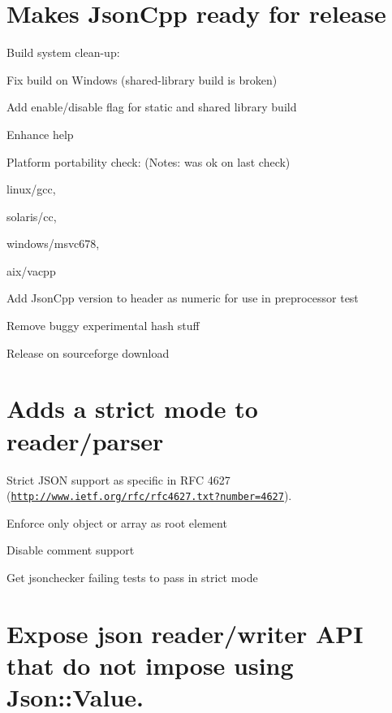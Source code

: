 \hypertarget{roadmap_ms_release}{}\section{Makes Json\+Cpp ready for release}\label{roadmap_ms_release}

\begin{DoxyItemize}
\item Build system clean-\/up\+:
\begin{DoxyItemize}
\item Fix build on Windows (shared-\/library build is broken)
\item Add enable/disable flag for static and shared library build
\item Enhance help
\end{DoxyItemize}
\item Platform portability check\+: (Notes\+: was ok on last check)
\begin{DoxyItemize}
\item linux/gcc,
\item solaris/cc,
\item windows/msvc678,
\item aix/vacpp
\end{DoxyItemize}
\item Add Json\+Cpp version to header as numeric for use in preprocessor test
\item Remove buggy experimental hash stuff
\item Release on sourceforge download 
\end{DoxyItemize}\hypertarget{roadmap_ms_strict}{}\section{Adds a strict mode to reader/parser}\label{roadmap_ms_strict}
Strict J\+S\+O\+N support as specific in R\+F\+C 4627 (\href{http://www.ietf.org/rfc/rfc4627.txt?number=4627}{\tt http\+://www.\+ietf.\+org/rfc/rfc4627.\+txt?number=4627}).
\begin{DoxyItemize}
\item Enforce only object or array as root element
\item Disable comment support
\item Get jsonchecker failing tests to pass in strict mode 
\end{DoxyItemize}\hypertarget{roadmap_ms_separation}{}\section{Expose json reader/writer A\+P\+I that do not impose using Json\+::\+Value.}\label{roadmap_ms_separation}
